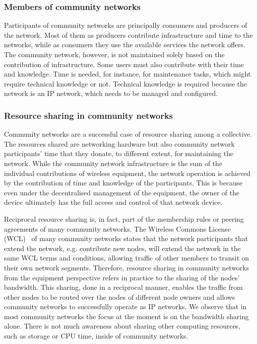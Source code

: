 \subsubsection{Members of community networks}

Participants of community networks are principally consumers and producers of the network. 
Most of them as producers contribute infrastructure and time to the networks, while as consumers they use the available services the network offers. 
The community network, however, is not maintained solely based on the contribution of infrastructure. 
Some users must also contribute with their time and knowledge.
Time is needed, for instance, for maintenance tasks, which might require technical knowledge or not. 
Technical knowledge is required because the network is an IP network, which needs to be managed and configured. 

\subsubsection{Resource sharing in community networks}

Community networks are a successful case of resource sharing among a collective. 
The resources shared are networking hardware but also community network participants' time that they donate, to different extent, for maintaining the network. 
While the community network infrastructure is the sum of the individual contributions of wireless equipment, the network operation is achieved by the contribution of time and knowledge of the participants.
This is because even under the decentralised management of the equipment, the owner of the device ultimately has the full access and control of that network device.

Reciprocal resource sharing is, in fact, part of the membership rules or peering agreements of many community networks. 
The Wireless Commons License (WCL)~\cite{WCL2010} of many community networks states that the network participants that extend the network, e.g. contribute new nodes, will extend the network in the same WCL terms and conditions, allowing traffic of other members to transit on their own network segments.
Therefore, resource sharing in community networks from the equipment perspective refers in practice to the sharing of the nodes' bandwidth. 
This sharing, done in a reciprocal manner, enables the traffic from other nodes to be routed over the nodes of different node owners and allows community networks to successfully operate as IP networks. 
We observe that in most community networks the focus at the moment is on the bandwidth sharing alone.
There is not much awareness about sharing other computing resources, such as storage or CPU time, inside of community networks. 


